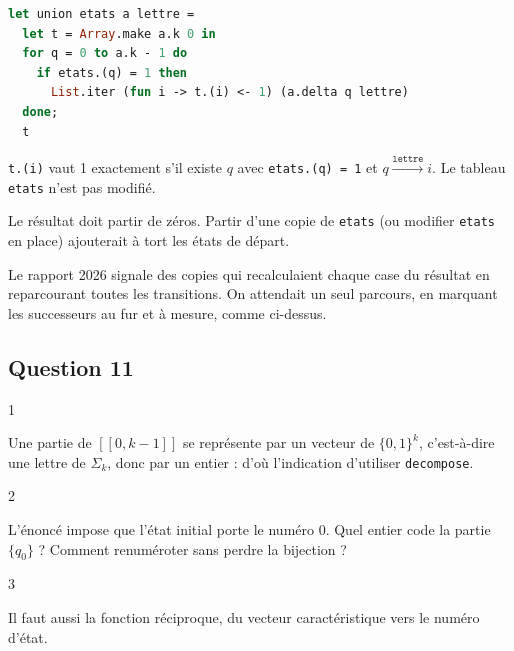 \documentclass[11pt,a4paper]{article}
\begin{document}
\begin{lstlisting}[language=Caml]
let union etats a lettre =
  let t = Array.make a.k 0 in
  for q = 0 to a.k - 1 do
    if etats.(q) = 1 then
      List.iter (fun i -> t.(i) <- 1) (a.delta q lettre)
  done;
  t
\end{lstlisting}

\texttt{t.(i)} vaut 1 exactement s'il existe \(q\) avec \texttt{etats.(q)\ =\ 1} et \(q\xrightarrow{\texttt{lettre}}i\). Le tableau \texttt{etats} n'est pas modifié.

\begin{piege}

Le résultat doit partir de zéros. Partir d'une copie de \texttt{etats} (ou modifier \texttt{etats} en place) ajouterait à tort les états de départ.

\end{piege}

\begin{jury}

Le rapport 2026 signale des copies qui recalculaient chaque case du résultat en reparcourant toutes les transitions. On attendait un seul parcours, en marquant les successeurs au fur et à mesure, comme ci-dessus.

\end{jury}

\hypertarget{question-11}{%
\subsection{Question 11}\label{question-11}}

\begin{indication}{1}

Une partie de \([\![0,k-1]\!]\) se représente par un vecteur de \(\{0,1\}^k\), c'est-à-dire une lettre de \(\Sigma_k\), donc par un entier : d'où l'indication d'utiliser \texttt{decompose}.

\end{indication}

\begin{indication}{2}

L'énoncé impose que l'état initial porte le numéro 0. Quel entier code la partie \(\{q_0\}\) ? Comment renuméroter sans perdre la bijection ?

\end{indication}

\begin{indication}{3}

Il faut aussi la fonction réciproque, du vecteur caractéristique vers le numéro d'état.

\end{indication}
\end{document}
